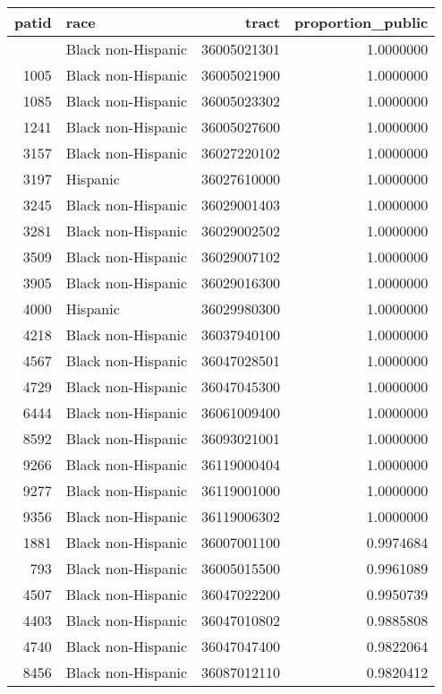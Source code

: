 \documentclass[
]{article}
\begin{document}
\begin{longtable}[]{@{}rlrr@{}}
\toprule\noalign{}
patid & race & tract & proportion\_public \\
\midrule\noalign{}
\endhead
\bottomrule\noalign{}
\endlastfoot
973 & Black non-Hispanic & 36005021301 & 1.0000000 \\
1005 & Black non-Hispanic & 36005021900 & 1.0000000 \\
1085 & Black non-Hispanic & 36005023302 & 1.0000000 \\
1241 & Black non-Hispanic & 36005027600 & 1.0000000 \\
3157 & Black non-Hispanic & 36027220102 & 1.0000000 \\
3197 & Hispanic & 36027610000 & 1.0000000 \\
3245 & Black non-Hispanic & 36029001403 & 1.0000000 \\
3281 & Black non-Hispanic & 36029002502 & 1.0000000 \\
3509 & Black non-Hispanic & 36029007102 & 1.0000000 \\
3905 & Black non-Hispanic & 36029016300 & 1.0000000 \\
4000 & Hispanic & 36029980300 & 1.0000000 \\
4218 & Black non-Hispanic & 36037940100 & 1.0000000 \\
4567 & Black non-Hispanic & 36047028501 & 1.0000000 \\
4729 & Black non-Hispanic & 36047045300 & 1.0000000 \\
6444 & Black non-Hispanic & 36061009400 & 1.0000000 \\
8592 & Black non-Hispanic & 36093021001 & 1.0000000 \\
9266 & Black non-Hispanic & 36119000404 & 1.0000000 \\
9277 & Black non-Hispanic & 36119001000 & 1.0000000 \\
9356 & Black non-Hispanic & 36119006302 & 1.0000000 \\
1881 & Black non-Hispanic & 36007001100 & 0.9974684 \\
793 & Black non-Hispanic & 36005015500 & 0.9961089 \\
4507 & Black non-Hispanic & 36047022200 & 0.9950739 \\
4403 & Black non-Hispanic & 36047010802 & 0.9885808 \\
4740 & Black non-Hispanic & 36047047400 & 0.9822064 \\
8456 & Black non-Hispanic & 36087012110 & 0.9820412 \\
\end{longtable}
\end{document}
